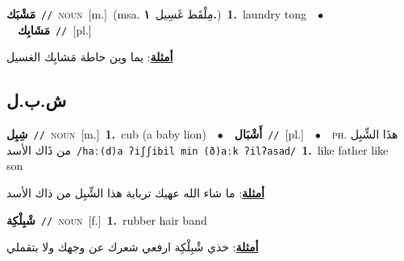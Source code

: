 \documentclass[10pt,a4paper,twoside]{article} %
\begin{document}
\begin{multicols}{2}
{{{{{{{{{{{{{\setlength\topsep{0pt}\textbf{\foreignlanguage{arabic}{مَشْبَك}}\ {\color{gray}\texttt{//}\color{black}}\ \textsc{noun}\ [m.]\ \color{gray}(msa. \foreignlanguage{arabic}{مِلْقَط غَسِيل}~\foreignlanguage{arabic}{\textbf{١.}})\color{black}\ \textbf{1.}~laundry tong\ \ $\bullet$\ \ \setlength\topsep{0pt}\textbf{\foreignlanguage{arabic}{مَشَابِك}}\ {\color{gray}\texttt{//}\color{black}}\ [pl.]\  \begin{flushright}\color{gray}\foreignlanguage{arabic}{\textbf{\underline{\foreignlanguage{arabic}{أمثلة}}}: يما وين حاطة مَشابِك الغسيل}\end{flushright}\color{black}} \vspace{2mm}

\vspace{-3mm}
\subsection*{\color{blue}\foreignlanguage{arabic}{ش.ب.ل}\color{blue}{}} 

{\setlength\topsep{0pt}\textbf{\foreignlanguage{arabic}{شِبِل}}\ {\color{gray}\texttt{//}\color{black}}\ \textsc{noun}\ [m.]\ \textbf{1.}~cub (a baby lion)\ \ $\bullet$\ \ \setlength\topsep{0pt}\textbf{\foreignlanguage{arabic}{أَشْبَال}}\ {\color{gray}\texttt{//}\color{black}}\ [pl.]\ \ $\bullet$\ \ \textsc{ph.} \color{gray} \foreignlanguage{arabic}{هذَا الشِّبِل من ذَاك الأسد}\color{black}\ {\color{gray}\texttt{/{\sffamily haː(d)a ʔiʃʃibil min (ð)aːk ʔilʔasad}/}\color{black}}\ \textbf{1.}~like father like son\  \begin{flushright}\color{gray}\foreignlanguage{arabic}{\textbf{\underline{\foreignlanguage{arabic}{أمثلة}}}: ما شاء الله عهيك ترباية هذا الشِّبِل من ذاك الأسد}\end{flushright}\color{black}} \vspace{2mm}

{\setlength\topsep{0pt}\textbf{\foreignlanguage{arabic}{شْبِلْكِة}}\ {\color{gray}\texttt{//}\color{black}}\ \textsc{noun}\ [f.]\ \textbf{1.}~rubber hair band\  \begin{flushright}\color{gray}\foreignlanguage{arabic}{\textbf{\underline{\foreignlanguage{arabic}{أمثلة}}}: خذي شْبِلْكِة ارفعي شعرك عن وجهك ولا بتقملي}\end{flushright}\color{black}} \vspace{2mm}

}}}}}}}}}}}}
\end{multicols}
\end{document}
